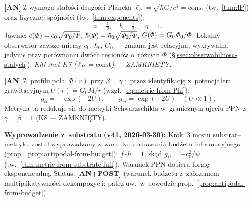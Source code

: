 \begin{chain}%
  \label{chain:A10}
  \textbf{[AN]}$\;$Z wymogu sta\l{}o\'sci d\l{}ugo\'sci Plancka
  $\ell_P = \sqrt{\hbar G / c^3} = \mathrm{const}$ (tw.~\ref{thm:lP})
  oraz fizycznej sp\'ojno\'sci (tw.~\ref{thm:exponents}):
  \begin{equation}\label{eq:H-exponents}
    a = \tfrac{1}{2},\quad b = \tfrac{1}{2},\quad g = 1.
  \end{equation}
  Jawnie: $c(\varPhi) = c_0\sqrt{\varPhi_0/\varPhi}$,
  $\hbar(\varPhi) = \hbar_0\sqrt{\varPhi_0/\varPhi}$,
  $G(\varPhi) = G_0\,\varPhi_0/\varPhi$.
  Lokalny obserwator zawsze mierzy $c_0$, $\hbar_0$, $G_0$ ---
  zmiana jest relacyjna, wykrywalna jedynie przy por\'ownaniu
  dw\'och region\'ow o~r\'o\.znym $\Phi$
  (\S\ref{ssec:obserwabilnosc-stalych}).
  \emph{Kill-shot K7 ($\ell_P = \mathrm{const}$) --- ZAMKNI\k{E}TY.}
\end{chain}

\begin{chain}\label{chain:A11}
  \textbf{[AN]}$\;$Z~profilu pola~$\Phi(r)$ przy $\beta = \gamma$
  i~przez identyfikacj\k{e} z~potencja\l{}em grawitacyjnym
  $U(r) = G_0 M / r$ (wzgl.~\eqref{eq:metric-from-Phi}):
  \begin{equation}\label{eq:H-gtt}
    g_{tt} = -\exp(-2U),\qquad
    g_{rr} = \exp(+2U)
    \quad (U \ll 1).
  \end{equation}
  Metryka ta redukuje si\k{e} do metryki Schwarzschilda
  w~granicznym uj\k{e}ciu PPN z~$\gamma = \beta = 1$
  (K8 --- ZAMKNI\k{E}TY).

  \medskip\noindent\textbf{Wyprowadzenie z~substratu (v41, 2026-03-30):}
  Krok~3 mostu substrat--metryka zosta\l{} wyprowadzony
  z~warunku zachowania bud\.zetu informacyjnego
  (prop.~\ref{prop:antipodal-from-budget}):
  $f \cdot h = 1$, sk\k{a}d $g_{tt} = -c_0^2/\psi$
  (tw.~\ref{thm:metric-from-substrate-full}).
  Warunek PPN dobiera form\k{e} eksponencjaln\k{a}.
  Status: \textbf{[AN+POST]} (warunek bud\.zetu z~za\l{}o\.zeniem
  multiplikatywno\'sci dekompozycji; patrz uw.\ w~dowodzie
  prop.~\ref{prop:antipodal-from-budget}).
\end{chain}

